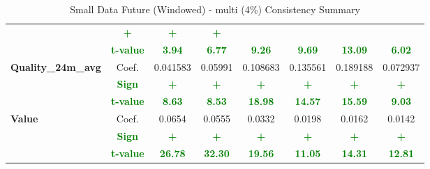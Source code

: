 \documentclass[11pt,english,a4paper,hidelinks]{book}
\begin{document}
\begin{table}[H]
\begin{tabular}{lccccccc}
                     & \textbf{\textcolor{green}{+}}
                     & \textbf{\textcolor{green}{+}}
                     & \textbf{\textcolor{green}{+}} \\
            & \textbf{\textcolor{green}{t-value}}
                     & \textbf{\textcolor{green}{3.94}}
                     & \textbf{\textcolor{green}{6.77}}
                     & \textbf{\textcolor{green}{9.26}}
                     & \textbf{\textcolor{green}{9.69}}
                     & \textbf{\textcolor{green}{13.09}}
                     & \textbf{\textcolor{green}{6.02}} \\
        \midrule
        \multirow{3}{*}{\textbf{Quality\_24m\_avg}}
            & Coef.   & 0.041583  & 0.05991   & 0.108683  & 0.135561  & 0.189188  & 0.072937  \\
            & \textbf{\textcolor{green}{Sign}}
                     & \textbf{\textcolor{green}{+}}
                     & \textbf{\textcolor{green}{+}}
                     & \textbf{\textcolor{green}{+}}
                     & \textbf{\textcolor{green}{+}}
                     & \textbf{\textcolor{green}{+}}
                     & \textbf{\textcolor{green}{+}} \\
            & \textbf{\textcolor{green}{t-value}}
                     & \textbf{\textcolor{green}{8.63}}
                     & \textbf{\textcolor{green}{8.53}}
                     & \textbf{\textcolor{green}{18.98}}
                     & \textbf{\textcolor{green}{14.57}}
                     & \textbf{\textcolor{green}{15.59}}
                     & \textbf{\textcolor{green}{9.03}} \\
        \midrule
        \multirow{3}{*}{\textbf{Value}} 
            & Coef.   & 0.0654  & 0.0555  & 0.0332  & 0.0198  & 0.0162  & 0.0142 \\
            & \textbf{\textcolor{green}{Sign}}    & \textbf{\textcolor{green}{+}}       & \textbf{\textcolor{green}{+}}       & \textbf{\textcolor{green}{+}}       & \textbf{\textcolor{green}{+}}       & \textbf{\textcolor{green}{+}}       & \textbf{\textcolor{green}{+}}      \\
            & \textbf{\textcolor{green}{t-value}} & \textbf{\textcolor{green}{26.78}}   & \textbf{\textcolor{green}{32.30}}   & \textbf{\textcolor{green}{19.56}}   & \textbf{\textcolor{green}{11.05}}   & \textbf{\textcolor{green}{14.31}}   & \textbf{\textcolor{green}{12.81}}  \\
        \bottomrule
    \end{tabular}
    \caption{Small Data Future (Windowed) - \acrshort{multi} (4\%) Consistency Summary}
    \label{tab:third_linear_regression_results_scores}
\end{table}
\end{document}

